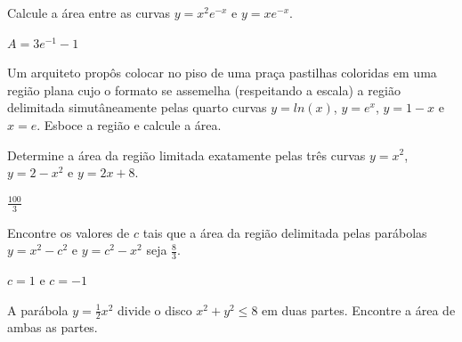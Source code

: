 \begin{exercises}
\begin{exercise}
Calcule a área entre as curvas $y=x^2e^{-x}$ e $y=xe^{-x}$.
\begin{answer}
  $A=3e^{-1}-1$
\end{answer}
\end{exercise}


\begin{exercise}
  Um arquiteto propôs colocar no piso de uma praça pastilhas coloridas
  em uma região plana cujo o formato se assemelha (respeitando a escala)
  a região delimitada simutâneamente pelas quarto curvas
  $y= ln(x)$, $y=e^x$, $y=1-x$ e $x=e$.
  Esboce a região e calcule a área.
\end{exercise}

\begin{exercise}
Determine a área da região limitada exatamente pelas três curvas
$y =x^2$, $ y = 2- x^2$ e $y = 2x + 8$.
\begin{answer}
  $\frac{100}{3}$
\end{answer}
\end{exercise}

\begin{exercise}
  Encontre os valores de $c$ tais que a área da região delimitada pelas
  parábolas $y = x^2 - c^2$ e $y=c^2-x^2$ seja $\frac{8}{3}$.
\begin{answer}
  $c=1$ e $c=-1$
\end{answer}
\end{exercise}

\begin{exercise}
  A parábola $y=\frac{1}{2}x^2$ divide o disco $x^2+y^2 \leq 8$ em duas partes.
  Encontre a área de ambas as partes.
\end{exercise}



\end{exercises}
